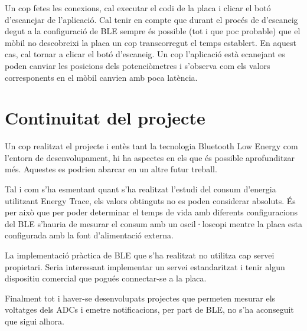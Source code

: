 Un cop fetes les conexions, cal executar el codi de la placa i clicar el botó d'escanejar de l'aplicació.
Cal tenir en compte que durant el procés de d'escaneig degut a la configuració de BLE sempre és possible (tot i que poc probable) que el mòbil no descobreixi la placa un cop transcorregut el temps establert.
En aquest cas, cal tornar a clicar el botó d'escaneig.
Un cop l'aplicació està ecanejant es poden canviar les posicions dels potenciòmetres i s'observa com els valors corresponents en el mòbil canvien amb poca latència.

\section{Continuitat del projecte}
Un cop realitzat el projecte i entès tant la tecnologia Bluetooth Low Energy com l'entorn de desenvolupament, hi ha aspectes en els que és possible aprofunditzar més.
Aquestes es podrien abarcar en un altre futur treball.

Tal i com s'ha esmentant quant s'ha realitzat l'estudi del consum d'energia utilitzant Energy Trace, els valors obtinguts no es poden considerar absoluts.
És per això que per poder determinar el temps de vida amb diferents configuracions del BLE s'hauria de mesurar el consum amb un oscil·loscopi mentre la placa esta configurada amb la font d'alimentació externa.

La implementació pràctica de BLE que s'ha realitzat no utilitza cap servei propietari.
Seria interessant implementar un servei estandaritzat i tenir algun dispositiu comercial que pogués connectar-se a la placa.

Finalment tot i haver-se desenvolupats projectes que permeten mesurar els voltatges dels ADCs i emetre notificacions, per part de BLE, no s'ha aconseguit que sigui alhora.

